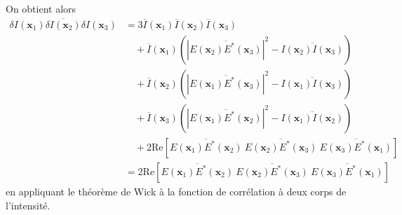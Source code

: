 On obtient alors 
\begin{align}
\overline{\delta I(\mathbf{x}_1) \delta I(\mathbf{x}_2) \delta I(\mathbf{x}_3)} &= 3 \overline{I}(\mathbf{x}_1) \overline{I}(\mathbf{x}_2) \overline{I}(\mathbf{x}_3)\\
\nonumber & \quad + \overline{I}(\mathbf{x}_1) \left( \left|\overline{E(\mathbf{x}_2)E^*(\mathbf{x}_3)} \right|^2 -\overline{I(\mathbf{x}_2)I(\mathbf{x}_3)}\right) \\
\nonumber & \quad + \overline{I}(\mathbf{x}_2) \left( \left|\overline{E(\mathbf{x}_1)E^*(\mathbf{x}_3)}\right|^2 - \overline{I(\mathbf{x}_1)I(\mathbf{x}_3)}\right)\\
\nonumber & \quad + \overline{I}(\mathbf{x}_3) \left(\left|\overline{E(\mathbf{x}_1)E^*(\mathbf{x}_2)}\right|^2 -\overline{I(\mathbf{x}_1)I(\mathbf{x}_2)}\right)\\
\nonumber & \quad + 2\mathrm{Re}\left[ \overline{E(\mathbf{x}_1)E^*(\mathbf{x}_2)} \: \overline{E(\mathbf{x}_2)E^*(\mathbf{x}_3)} \: \overline{E(\mathbf{x}_3)E^*(\mathbf{x}_1)}\right] \\
&= 2\mathrm{Re}\left[ \overline{E(\mathbf{x}_1)E^*(\mathbf{x}_2)} \: \overline{E(\mathbf{x}_2)E^*(\mathbf{x}_3)} \: \overline{E(\mathbf{x}_3)E^*(\mathbf{x}_1)}\right]
\end{align}
en appliquant le théorème de Wick à la fonction de corrélation à deux corps de l'intensité.





